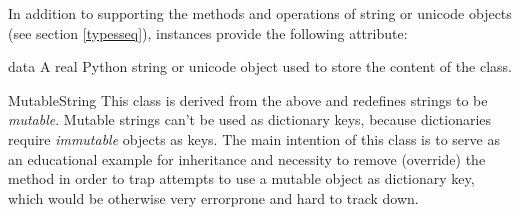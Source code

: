 In addition to supporting the methods and operations of string  or
unicode objects (see section \ref{typesseq}),  instances
provide the following attribute:

\begin{memberdesc}{data}
A real Python string or unicode object used to store the content of the
 class.
\end{memberdesc}

\begin{classdesc}{MutableString}{}
This class is derived from the  above and redefines
strings to be \emph{mutable}.  Mutable strings can't be used as
dictionary keys, because dictionaries require \emph{immutable} objects as
keys.  The main intention of this class is to serve as an educational
example for inheritance and necessity to remove (override) the
 method in order to trap attempts to use a
mutable object as dictionary key, which would be otherwise very
errorprone and hard to track down.
\end{classdesc}
